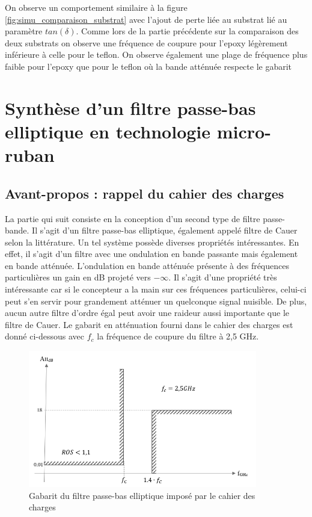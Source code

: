 \documentclass[french]{article}
\begin{document}
On observe un comportement similaire à la figure \ref{fig:simu_comparaison_substrat} avec l'ajout de perte liée au substrat lié au paramètre $tan(\delta)$. Comme lors de la partie précédente sur la comparaison des deux substrats on observe une fréquence de coupure pour l'epoxy légèrement inférieure à celle pour le teflon. On observe également une plage de fréquence plus faible pour l'epoxy que pour le teflon où la bande atténuée respecte le gabarit 



\newpage

\section{Synthèse d'un filtre passe-bas elliptique en technologie micro-ruban}

\subsection{Avant-propos : rappel du cahier des charges}

La partie qui suit consiste en la conception d'un second type de filtre passe-bande. Il s'agit d'un filtre passe-bas elliptique, également appelé filtre de Cauer selon la littérature. Un tel système possède diverses propriétés intéressantes. En effet, il s'agit d'un filtre avec une ondulation en bande passante mais également en bande atténuée. L'ondulation en bande atténuée présente à des fréquences particulières un gain en dB projeté vers $-\infty$. Il s'agit d'une propriété très intéressante car si le concepteur a la main sur ces fréquences particulières, celui-ci peut s'en servir pour grandement atténuer un quelconque signal nuisible. De plus, aucun autre filtre d'ordre égal peut avoir une raideur aussi importante que le filtre de Cauer. 
Le gabarit en atténuation fourni dans le cahier des charges est donné ci-dessous avec $f_c$ la fréquence de coupure du filtre à 2,5 GHz.

\begin{figure}[H]
	\centering
	\includegraphics[width=10cm]{../3synthPBas/elliptique/gabarit_passe-bas_elliptique.png}
	\caption{Gabarit du filtre passe-bas elliptique imposé par le cahier des charges}
	\label{fig:gabarit_elliptique}
\end{figure}
\end{document}
